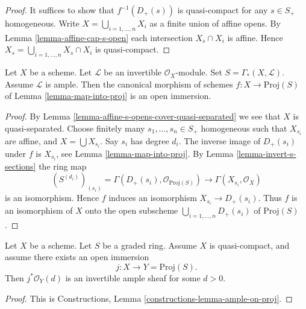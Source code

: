 \begin{proof}
It suffices to show that $f^{-1}(D_{+}(s))$ is quasi-compact
for any $s \in S_{+}$ homogeneous. Write
$X = \bigcup_{i = 1, \ldots, n} X_i$ as a finite union of
affine opens. By Lemma \ref{lemma-affine-cap-s-open} each intersection
$X_s \cap X_i$ is affine. Hence $X_s = \bigcup_{i = 1, \ldots, n} X_s \cap X_i$
is quasi-compact.
\end{proof}

\begin{lemma}
\label{lemma-ample-immersion-into-proj}
Let $X$ be a scheme. Let $\mathcal{L}$ be an invertible $\mathcal{O}_X$-module.
Set $S = \Gamma_*(X, \mathcal{L})$.
Assume $\mathcal{L}$ is ample. Then the canonical morphism of schemes
$f : X \longrightarrow \text{Proj}(S)$ of Lemma \ref{lemma-map-into-proj}
is an open immersion.
\end{lemma}

\begin{proof}
By Lemma \ref{lemma-affine-s-opens-cover-quasi-separated} we see
that $X$ is quasi-separated. Choose finitely many
$s_1, \ldots, s_n \in S_{+}$ homogeneous
such that $X_{s_i}$ are affine, and $X = \bigcup X_{s_i}$.
Say $s_i$ has degree $d_i$. The inverse image of
$D_{+}(s_i)$ under $f$ is $X_{s_i}$, see Lemma \ref{lemma-map-into-proj}.
By Lemma \ref{lemma-invert-s-sections} the ring map
$$
(S^{(d_i)})_{(s_i)} = \Gamma(D_{+}(s_i), \mathcal{O}_{\text{Proj}(S)})
\longrightarrow
\Gamma(X_{s_i}, \mathcal{O}_X)
$$
is an isomorphism. Hence $f$ induces an isomorphism
$X_{s_i} \to D_{+}(s_i)$. Thus $f$ is an isomorphism of $X$ onto the open
subscheme $\bigcup_{i = 1, \ldots, n} D_{+}(s_i)$ of $\text{Proj}(S)$.
\end{proof}

\begin{lemma}
\label{lemma-open-in-proj-ample}
Let $X$ be a scheme.
Let $S$ be a graded ring. Assume $X$ is quasi-compact,
and assume there exists an open immersion
$$
j : X \longrightarrow Y = \text{Proj}(S).
$$
Then $j^*\mathcal{O}_Y(d)$ is an invertible ample sheaf
for some $d > 0$.
\end{lemma}

\begin{proof}
This is Constructions, Lemma \ref{constructions-lemma-ample-on-proj}.
\end{proof}

